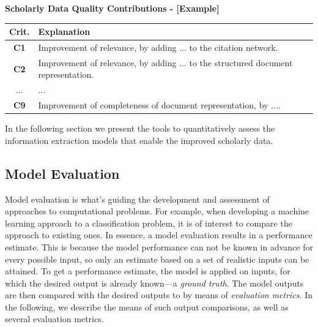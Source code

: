 \begin{infobox-progress}
      \textbf{Scholarly Data Quality Contributions - [Example]}\vspace{0.5em}

      \begin{tabular}{cp{11.3cm}}
        \toprule
        Crit. & Explanation \\
        \midrule
        \textbf{C1} & Improvement of relevance, by adding ... to the citation network. \\
        \textbf{C2} & Improvement of relevance, by adding ... to the structured document representation. \\
        ... & ... \\
        \textbf{C9} & Improvement of completeness of document representation, by .... \\
        \bottomrule
      \end{tabular}

\end{infobox-progress}

In the following section we present the tools to quantitatively assess the information extraction models that enable the improved scholarly data.

\subsection{Model Evaluation}

Model evaluation is what's guiding the development and assessment of approaches to computational problems. For example, when developing a machine learning approach to a classification problem, it is of interest to compare the approach to existing ones. In essence, a model evaluation results in a performance estimate. This is because the model performance can not be known in advance for every possible input, so only an estimate based on a set of realistic inputs can be attained.
To get a performance estimate, the model is applied on inputs, for which the desired output is already known---a \emph{ground truth}. The model outputs are then compared with the desired outputs to by means of \emph{evaluation metrics}. In the following, we describe the means of such output comparisons, as well as several evaluation metrics.

